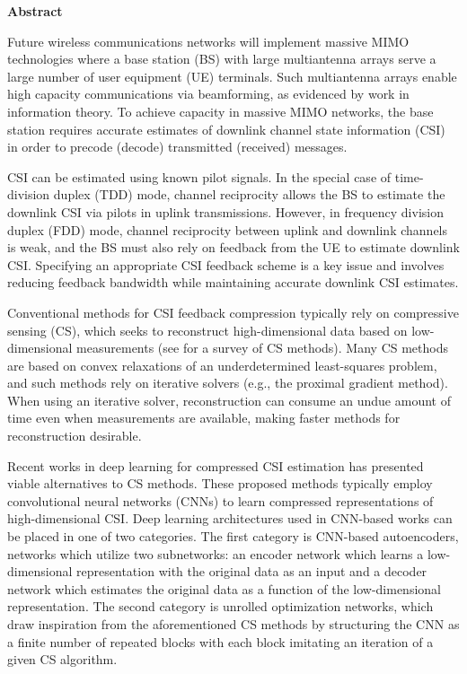 \newpage
\centerline{\Huge \bf {Abstract}} \vspace{18pt}

Future wireless communications networks will implement massive MIMO technologies where a base station (BS) with large multiantenna arrays serve a large number of user equipment (UE) terminals. Such multiantenna arrays enable high capacity communications via beamforming, as evidenced by work in information theory. To achieve capacity in massive MIMO networks, the base station requires accurate estimates of downlink channel state information (CSI) in order to precode (decode) transmitted (received) messages.

CSI can be estimated using known pilot signals. In the special case of time-division duplex (TDD) mode, channel reciprocity allows the BS to estimate the downlink CSI via pilots in uplink transmissions. However, in frequency division duplex (FDD) mode, channel reciprocity between uplink and downlink channels is weak, and the BS must also rely on feedback from the UE to estimate downlink CSI. Specifying an appropriate CSI feedback scheme is a key issue and involves reducing feedback bandwidth while maintaining accurate downlink CSI estimates.

Conventional methods for CSI feedback compression typically rely on compressive sensing (CS), which seeks to reconstruct high-dimensional data based on low-dimensional measurements (see for a survey of CS methods). Many CS methods are based on convex relaxations of an underdetermined least-squares problem, and such methods rely on iterative solvers (e.g., the proximal gradient method). When using an iterative solver, reconstruction can consume an undue amount of time even when measurements are available, making faster methods for reconstruction desirable.

Recent works in deep learning for compressed CSI estimation has presented viable alternatives to CS methods. These proposed methods typically employ convolutional neural networks (CNNs) to learn compressed representations of high-dimensional CSI. Deep learning architectures used in CNN-based works can be placed in one of two categories. The first category is CNN-based autoencoders, networks which utilize two subnetworks: an encoder network which learns a low-dimensional representation with the original data as an input and a decoder network which estimates the original data as a function of the low-dimensional representation. The second category is unrolled optimization networks, which draw inspiration from the aforementioned CS methods by structuring the CNN as a finite number of repeated blocks with each block imitating an iteration of a given CS algorithm.

